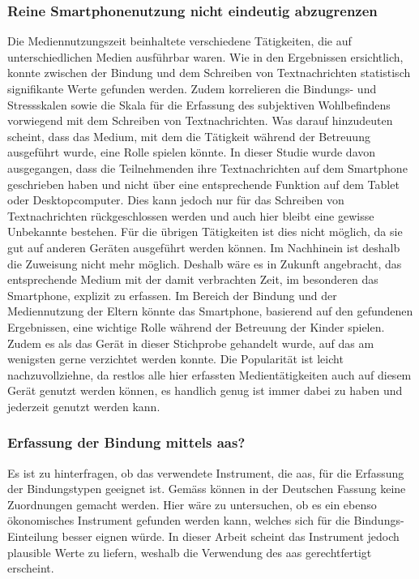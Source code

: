 \subsubsection{Reine Smartphonenutzung nicht eindeutig abzugrenzen}
Die Mediennutzungszeit beinhaltete verschiedene Tätigkeiten, die auf unterschiedlichen Medien ausführbar waren. Wie in den Ergebnissen ersichtlich, konnte zwischen der Bindung und dem Schreiben von Textnachrichten statistisch signifikante Werte gefunden werden. Zudem korrelieren die Bindungs- und Stressskalen sowie die Skala für die Erfassung des subjektiven Wohlbefindens vorwiegend mit dem Schreiben von Textnachrichten. Was darauf hinzudeuten scheint, dass das Medium, mit dem die Tätigkeit während der Betreuung ausgeführt wurde, eine Rolle spielen könnte. In dieser Studie wurde davon ausgegangen, dass die Teilnehmenden ihre Textnachrichten auf dem Smartphone geschrieben haben und nicht über eine entsprechende Funktion auf dem Tablet oder Desktopcomputer. Dies kann jedoch nur für das Schreiben von Textnachrichten rückgeschlossen werden und auch hier bleibt eine gewisse Unbekannte bestehen. Für die übrigen Tätigkeiten ist dies nicht möglich, da sie gut auf anderen Geräten ausgeführt werden können. Im Nachhinein ist deshalb die Zuweisung nicht mehr möglich. Deshalb wäre es in Zukunft angebracht, das entsprechende Medium mit der damit verbrachten Zeit, im besonderen das Smartphone, explizit zu erfassen. Im Bereich der Bindung und der Mediennutzung der Eltern könnte das Smartphone, basierend auf den gefundenen Ergebnissen, eine wichtige Rolle während der Betreuung der Kinder spielen. Zudem es als das Gerät in dieser Stichprobe gehandelt wurde, auf das am wenigsten gerne verzichtet werden konnte. Die Popularität ist leicht nachzuvollziehne, da restlos alle hier erfassten Medientätigkeiten auch auf diesem Gerät genutzt werden können, es handlich genug ist immer dabei zu haben und jederzeit genutzt werden kann. 

\subsubsection{Erfassung der Bindung mittels \acrshort{aas}?}
Es ist zu hinterfragen, ob das verwendete Instrument, die \acrfull{aas}, für die Erfassung der Bindungstypen geeignet ist. Gemäss  können in der Deutschen Fassung keine Zuordnungen gemacht werden. Hier wäre zu untersuchen, ob es ein ebenso ökonomisches Instrument gefunden werden kann, welches sich für die Bindungs-Einteilung besser eignen würde. In dieser Arbeit scheint das Instrument jedoch plausible Werte zu liefern, weshalb die Verwendung des \acrshort{aas} gerechtfertigt erscheint. 

